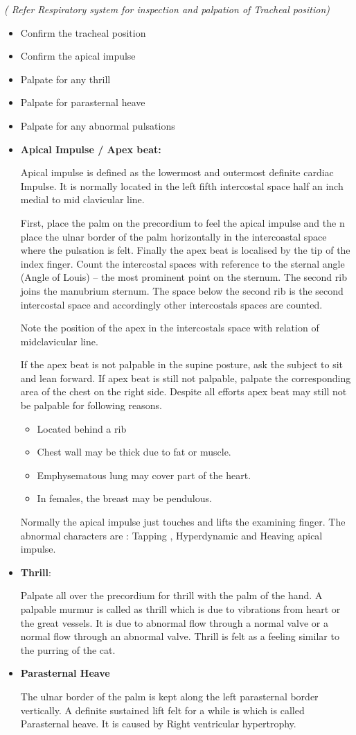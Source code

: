 \documentclass[a4paper,12pt,openany,twoside]{book}
\begin{document}
\emph{( Refer Respiratory system for inspection and palpation of Tracheal position)}
\begin{itemize}
\item{Confirm the tracheal position}
\item{Confirm the apical impulse}
\item{Palpate for any thrill}
\item{Palpate for parasternal heave}
\item{Palpate for any abnormal pulsations}
\item{\textbf{Apical Impulse / Apex beat:}
	\par
	Apical impulse is defined as the lowermost and outermost definite cardiac Impulse. It is normally located in the left fifth intercostal space half an inch medial to mid clavicular line.
	\par
	First, place the palm on the precordium to feel the apical impulse and the n place the ulnar border of the palm horizontally in the intercoastal space where the pulsation is felt. Finally the apex beat is localised by the tip of the index finger. Count the intercostal spaces with reference to the sternal angle (Angle of Louis) – the most prominent point on the sternum. The second rib joins the manubrium sternum. The space below the second rib is the second intercostal space and accordingly other intercostals spaces are counted. 
	\par
	Note the position of the apex in the intercostals space with relation of midclavicular line.
	\par
	If the apex beat is not palpable in the supine posture, ask the subject to sit and lean forward. If apex beat is still not palpable, palpate the corresponding area of the chest on the right side. Despite all efforts apex beat may still not be palpable for following reasons.
	\begin{itemize}
\item{ Located behind a rib}
\item{ Chest wall may be thick due to fat or muscle.}
\item{ Emphysematous lung may cover part of the heart.}
\item{ In females, the breast may be pendulous.}
	\end{itemize}
	\par
	Normally the apical impulse just touches and lifts the examining finger. The abnormal characters are : Tapping , Hyperdynamic and Heaving apical impulse.
	}
\item{\textbf{Thrill}:
	\par
	Palpate all over the precordium for thrill with the palm of the hand. A palpable murmur is called as thrill which is due to vibrations from heart or the great vessels. It is due to abnormal flow through a normal valve or a normal flow through an abnormal valve. Thrill is felt as a feeling similar to the purring of the cat.
	}										    
\item{\textbf{Parasternal Heave}
	\par
The ulnar border of the palm is kept along the left parasternal border vertically. A definite sustained lift felt for a while is which is called Parasternal heave. It is caused by Right ventricular hypertrophy.
}
\end{itemize}
\end{document}
